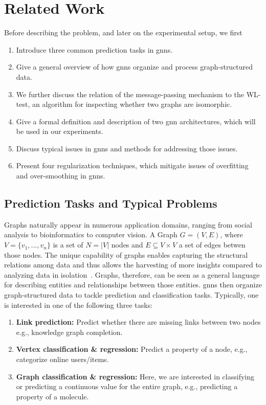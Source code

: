 %
\chapter{Related Work}
\label{sec:related}

Before describing the problem, and later on the experimental setup, we first
\begin{enumerate}
    \item Introduce three common prediction tasks in \acp{gnn}.
    \item Give a general overview of how \acp{gnn} organize and process graph-structured data.
    \item We further discuss the relation of the message-passing mechanism to the WL-test, an algorithm for
          inspecting whether two graphs are isomorphic.
    \item Give a formal definition and description of two \ac{gnn}
          architectures, which will be used in our experiments.
    \item Discuss typical issues in \acp{gnn} and methods for addressing those issues.
    \item Present four regularization techniques, which mitigate issues of overfitting and over-smoothing in \acp{gnn}.
\end{enumerate}

\section{Prediction Tasks and Typical Problems}
\label{sec:related:pred}

Graphs naturally appear in numerous application domains, ranging from social analysis to bioinformatics to computer vision.
A Graph $G = (V,E)$, where $V = \{v_{1},...,v_{n}\}$ is a set of $N =|V|$ nodes and $E \subseteq V\times V$ a set of edges betwen those nodes. The unique capability of graphs enables capturing the structural relations among data and thus allows the harvesting of more insights compared to analyzing data in isolation~\cite{Zhang19}. Graphs, therefore, can be seen as a general language for describing entities and relationships between those entities.
\Acfp{gnn} then organize graph-structured data to tackle prediction and classification tasks.
Typically, one is interested in one of the following three tasks:
\begin{enumerate}[label=\textbf{\arabic*.}]
    \item \textbf{Link prediction:}
          Predict whether there are missing links between two nodes
          e.g., knowledge graph completion.

    \item \textbf{Vertex classification \& regression:}
          Predict a property of a node, e.g., categorize online users/items.

    \item \textbf{Graph classification \& regression:}
          Here, we are interested in classifying or predicting a continuous value for
          the entire graph, e.g., predicting a property of a molecule.
\end{enumerate}


